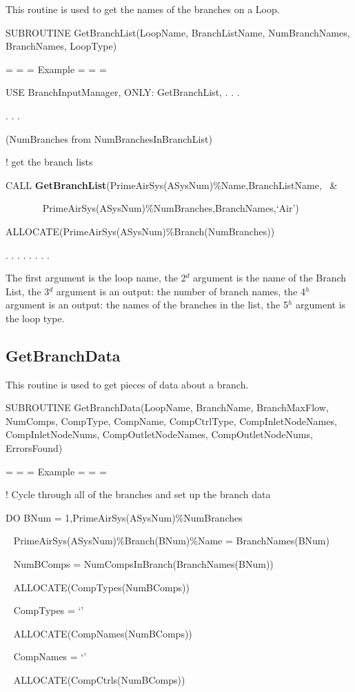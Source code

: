 This routine is used to get the names of the branches on a Loop.

SUBROUTINE GetBranchList(LoopName, BranchListName, NumBranchNames, BranchNames, LoopType)

= = = Example = = =

USE BranchInputManager, ONLY: GetBranchList, . . .

. . .

(NumBranches from NumBranchesInBranchList)

! get the branch lists

CALL \textbf{GetBranchList}(PrimeAirSys(ASysNum)\%Name,BranchListName, ~\&

~~~~~~~ PrimeAirSys(ASysNum)\%NumBranches,BranchNames,`Air')

ALLOCATE(PrimeAirSys(ASysNum)\%Branch(NumBranches))

. . . . . . . .

The first argument is the loop name, the 2\(^{d}\) argument is the name of the Branch List, the 3\(^{d}\) argument is an output: the number of branch names, the 4\(^{h}\) argument is an output: the names of the branches in the list, the 5\(^{h}\) argument is the loop type.

\subsection{GetBranchData}\label{getbranchdata}

This routine is used to get pieces of data about a branch.

SUBROUTINE GetBranchData(LoopName, BranchName, BranchMaxFlow, NumComps, CompType, CompName, CompCtrlType, CompInletNodeNames, CompInletNodeNums, CompOutletNodeNames, CompOutletNodeNums, ErrorsFound)

= = = Example = = =

! Cycle through all of the branches and set up the branch data

DO BNum = 1,PrimeAirSys(ASysNum)\%NumBranches

~ PrimeAirSys(ASysNum)\%Branch(BNum)\%Name = BranchNames(BNum)

~ NumBComps = NumCompsInBranch(BranchNames(BNum))

~ ALLOCATE(CompTypes(NumBComps))

~ CompTypes = `'

~ ALLOCATE(CompNames(NumBComps))

~ CompNames = `'

~ ALLOCATE(CompCtrls(NumBComps))

